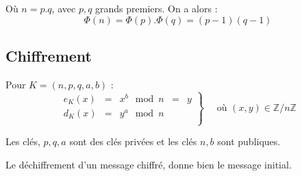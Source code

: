 \documentclass[a4paper, 10pt]{thesis}
\begin{document}
Où $n = p.q$, avec $p, q$ grands premiers. On a alors : 
\begin{displaymath}
    \Phi(n) = \Phi(p) . \Phi(q) = (p-1)(q-1)
\end{displaymath}

\subsection{Chiffrement}

Pour $K = (n, p, q, a, b)$ :
\begin{displaymath}
    \left .
    \begin{array}{ccccc}
        e_K(x) & = & x^b \mod n & = & y \\
        d_K(x) & = & y^a \mod n \\
    \end{array}
    \right \rbrace
    \quad \mbox{ où } (x, y) \in \mathbb{Z}/n\mathbb{Z}
\end{displaymath}

Les clés, $p, q, a$ sont des clés privées et les clés $n, b$ sont publiques.

\begin{thrm}
    Le déchiffrement d'un message chiffré, donne bien le message initial.
\end{thrm}
\end{document}

